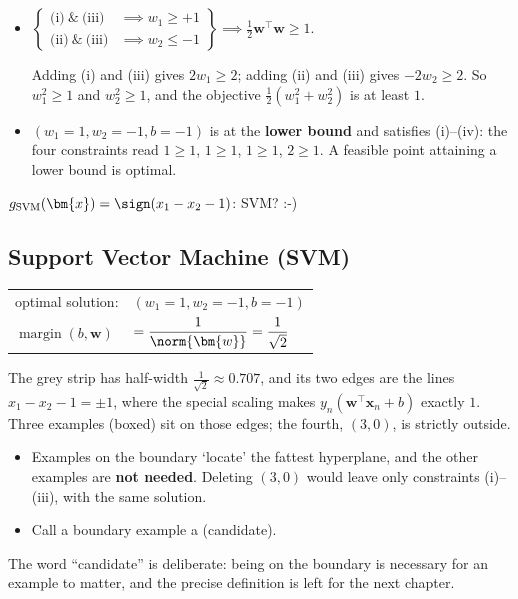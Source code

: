 \begin{itemize}
    \item \(\left\{ \begin{aligned}
            \text{(i)} \ \& \ \text{(iii)} &\implies w_1 \ge +1\\
            \text{(ii)} \ \& \ \text{(iii)} &\implies w_2 \le -1
        \end{aligned} \right\} \implies \frac{1}{2} \bm{w}^\top \bm{w} \ge
        1\).

        Adding (i) and (iii) gives \(2w_1 \ge 2\); adding (ii) and (iii)
        gives \(-2w_2 \ge 2\). So \(w_1^2 \ge 1\) and \(w_2^2 \ge 1\), and the
        objective \(\frac{1}{2}(w_1^2 + w_2^2)\) is at least \(1\).
    \item \((w_1 = 1, w_2 = -1, b = -1)\) is at the \textbf{lower bound} and
        satisfies (i)--(iv): the four constraints read \(1 \ge 1\), \(1 \ge
        1\), \(1 \ge 1\), \(2 \ge 1\). A feasible point attaining a lower
        bound is optimal.
\end{itemize}

\begin{moral}
    \(g_{\mathrm{SVM}}(\bm{x}) = \sign(x_1 - x_2 - 1)\): SVM? :-)
\end{moral}

\subsection{Support Vector Machine (SVM)}

\begin{center}
    \begin{minipage}[c]{0.56\textwidth}
        \begin{tabular}{@{}ll@{}}
            optimal solution: & \((w_1 = 1, w_2 = -1, b = -1)\)\\[4pt]
            \(\operatorname{margin}(b, \bm{w})\) & \(=
                \dfrac{1}{\norm{\bm{w}}} = \dfrac{1}{\sqrt{2}}\)
        \end{tabular}
    \end{minipage}%
    \hfill
    \begin{minipage}[c]{0.4\textwidth}
        \centering
        \svmtoysolution
    \end{minipage}
\end{center}

The grey strip has half-width \(\frac{1}{\sqrt{2}} \approx 0.707\), and its
two edges are the lines \(x_1 - x_2 - 1 = \pm 1\), where the special
scaling makes \(y_n(\bm{w}^\top \bm{x}_n + b)\) exactly \(1\). Three
examples (boxed) sit on those edges; the fourth, \((3, 0)\), is strictly
outside.
\begin{itemize}
    \item Examples on the boundary `locate' the fattest hyperplane, and
        the other examples are \textbf{not needed}. Deleting \((3, 0)\) would leave
        only constraints (i)--(iii), with the same solution.
    \item Call a boundary example a  (candidate).
\end{itemize}
The word ``candidate'' is deliberate: being on the boundary is necessary for
an example to matter, and the precise definition is left for the next
chapter.

